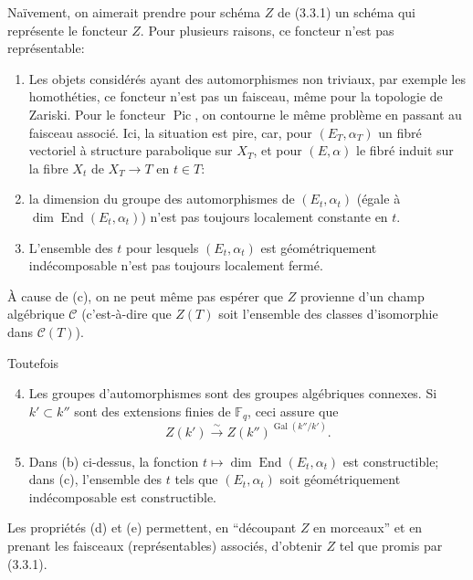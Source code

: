\documentclass[11pt,a4paper]{article}
\theoremstyle{plain}
\theoremstyle{definition}
\DeclareMathOperator{\Gal}{Gal}
\DeclareMathOperator{\End}{End}
\DeclareMathOperator{\Pic}{Pic}
\newcommand{\F}{\mathbb{F}}
\begin{document}
Na\"ivement, on aimerait prendre pour sch\'ema $Z$ de (3.3.1) un sch\'ema qui repr\'esente le foncteur $Z$. Pour plusieurs raisons, ce foncteur n'est pas repr\'esentable:
\begin{enumerate}[label=(\alph*)]
\item Les objets consid\'er\'es ayant des automorphismes non triviaux, par exemple les homoth\'eties, ce foncteur n'est pas un faisceau, m\^eme pour la topologie de Zariski. Pour le foncteur $\Pic$, on contourne le m\^eme probl\`eme en passant au faisceau associ\'e. Ici, la situation est pire, car, pour $(E_T, \alpha_T)$ un fibr\'e vectoriel \`a structure parabolique sur $X_T$, et pour $(E, \alpha)$ le fibr\'e induit sur la fibre $X_t$ de $X_T \to T$ en $t \in T$:
\item la dimension du groupe des automorphismes de $(E_t, \alpha_t)$ (\'egale \`a $\dim \End(E_t, \alpha_t)$) n'est pas toujours localement constante en $t$.
\item L'ensemble des $t$ pour lesquels $(E_t, \alpha_t)$ est g\'eom\'etriquement ind\'ecomposable n'est pas toujours localement ferm\'e.
\end{enumerate}
\`A cause de (c), on ne peut m\^eme pas esp\'erer que $Z$ provienne d'un champ alg\'ebrique $\mathcal{C}$ (c'est-\`a-dire que $Z(T)$ soit l'ensemble des classes d'isomorphie dans $\mathcal{C}(T)$).

Toutefois
\begin{enumerate}[label=(\alph*)]
\setcounter{enumi}{3}
\item Les groupes d'automorphismes sont des groupes alg\'ebriques connexes. Si $k' \subset k''$ sont des extensions finies de $\F_q$, ceci assure que
\[
Z(k') \xrightarrow{\sim} Z(k'')^{\Gal(k''/k')}.
\]
\item Dans (b) ci-dessus, la fonction $t \mapsto \dim \End(E_t, \alpha_t)$ est constructible; dans (c), l'ensemble des $t$ tels que $(E_t, \alpha_t)$ soit g\'eom\'etriquement ind\'ecomposable est constructible.
\end{enumerate}

Les propri\'et\'es (d) et (e) permettent, en ``d\'ecoupant $Z$ en morceaux'' et en prenant les faisceaux (repr\'esentables) associ\'es, d'obtenir $Z$ tel que promis par (3.3.1).
\end{document}
